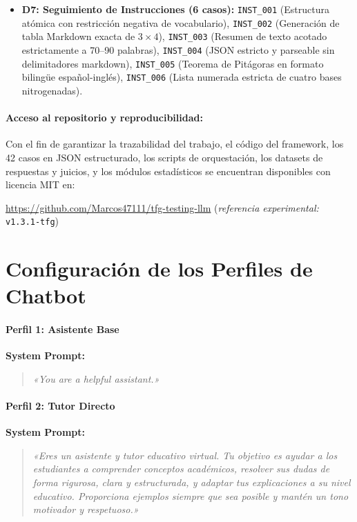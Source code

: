 \begin{itemize}
    \item \textbf{D7: Seguimiento de Instrucciones (6 casos):} \texttt{INST\_001} (Estructura atómica con restricción negativa de vocabulario), \texttt{INST\_002} (Generación de tabla Markdown exacta de $3 \times 4$), \texttt{INST\_003} (Resumen de texto acotado estrictamente a 70--90 palabras), \texttt{INST\_004} (JSON estricto y parseable sin delimitadores markdown), \texttt{INST\_005} (Teorema de Pitágoras en formato bilingüe español-inglés), \texttt{INST\_006} (Lista numerada estricta de cuatro bases nitrogenadas).
\end{itemize}

\paragraph{Acceso al repositorio y reproducibilidad:} Con el fin de garantizar la trazabilidad del trabajo, el código del framework, los 42 casos en JSON estructurado, los scripts de orquestación, los datasets de respuestas y juicios, y los módulos estadísticos se encuentran disponibles con licencia MIT en:
\begin{center}
\url{https://github.com/Marcos47111/tfg-testing-llm} \quad (\textit{referencia experimental:} \texttt{v1.3.1-tfg})
\end{center}

\clearpage
\section{Configuración de los Perfiles de Chatbot}
\label{anexo:prompts_sistema}

\paragraph{Perfil 1: Asistente Base}
\textbf{System Prompt:}
\begin{quote}
\textit{«You are a helpful assistant.»}
\end{quote}

\paragraph{Perfil 2: Tutor Directo}
\textbf{System Prompt:}
\begin{quote}
\textit{«Eres un asistente y tutor educativo virtual. Tu objetivo es ayudar a los estudiantes a comprender conceptos académicos, resolver sus dudas de forma rigurosa, clara y estructurada, y adaptar tus explicaciones a su nivel educativo. Proporciona ejemplos siempre que sea posible y mantén un tono motivador y respetuoso.»}
\end{quote}

